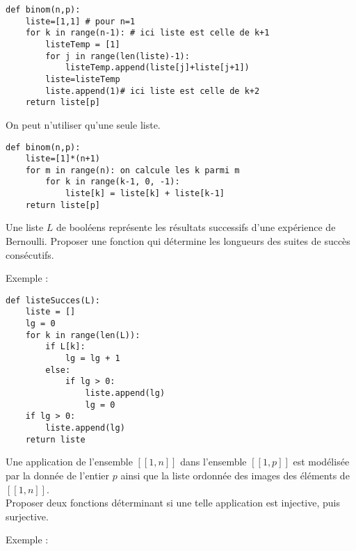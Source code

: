 \begin{Answer}
\begin{lstlisting}
def binom(n,p):
    liste=[1,1] # pour n=1
    for k in range(n-1): # ici liste est celle de k+1 
        listeTemp = [1]
        for j in range(len(liste)-1):
            listeTemp.append(liste[j]+liste[j+1])
        liste=listeTemp
        liste.append(1)# ici liste est celle de k+2
    return liste[p]
\end{lstlisting}

\newpage

On peut n'utiliser qu'une seule liste.
\begin{lstlisting}
def binom(n,p):
    liste=[1]*(n+1)
    for m in range(n): on calcule les k parmi m
        for k in range(k-1, 0, -1):
            liste[k] = liste[k] + liste[k-1]
    return liste[p]
\end{lstlisting}
\end{Answer}
\begin{Exercise}
Une liste $L$ de booléens représente les résultats successifs d'une expérience de Bernoulli. Proposer une fonction qui détermine les longueurs des suites de succès consécutifs. 

Exemple : 
\end{Exercise}
\begin{Answer}
\begin{lstlisting}
def listeSucces(L):
    liste = []
    lg = 0
    for k in range(len(L)):
        if L[k]:
            lg = lg + 1
        else:
            if lg > 0:
                liste.append(lg)
                lg = 0
    if lg > 0:
        liste.append(lg)
    return liste
\end{lstlisting}
\end{Answer}
\begin{Exercise}
Une application de l'ensemble $[\![1, n]\!]$ dans l'ensemble $[\![1, p]\!]$ est modélisée par la donnée de l'entier $p$ ainsi que la liste ordonnée des images des éléments de $[\![1, n]\!]$.\\
Proposer deux fonctions déterminant si une telle application est injective, puis surjective. 

Exemple : 
\end{Exercise}
